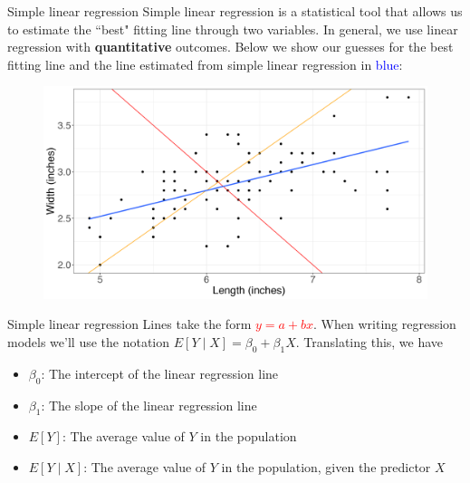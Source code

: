 \documentclass[10pt,t]{beamer}
\begin{document}
\begin{frame}{Simple linear regression}
Simple linear regression is a statistical tool that allows us to estimate the ``best" fitting line through two variables. In general, we use linear regression with \textbf{quantitative} outcomes. Below we show our guesses for the best fitting line and the line estimated from simple linear regression in \textcolor{blue}{blue}:

\begin{figure}
	\centering \includegraphics[scale=0.35]{points4.png}
\end{figure}

\end{frame}

\begin{frame}{Simple linear regression}
Lines take the form \textcolor{red}{$y = a + bx$}. When writing regression models we'll use the notation $E[Y \mid X] = \beta_0 + \beta_1 X$. Translating this, we have

\vspace{0.3cm}

\begin{itemize}
	\item $\beta_0$: The intercept of the linear regression line
	\item $\beta_1$: The slope of the linear regression line
	\item $E[Y]$: The average value of $Y$ in the population
	\item $E[Y \mid X]$: The average value of $Y$ in the population, given the predictor $X$
\end{itemize}
\end{frame}
\end{document}
